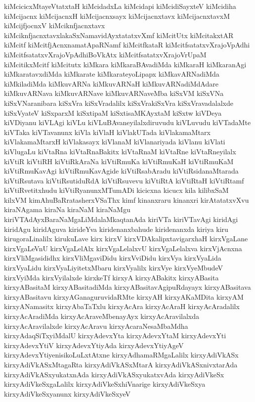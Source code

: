 {kiMcicicxMtayeVtatxtaH
kiMcidadxLa
kiMcidapi
kiMcidiSayxteV
kiMcidiha
kiMcijacnx
kiMcijacnxH
kiMcijacnxsayx
kiMcijacnxtavx
kiMcijacnxtavxM
kiMcijfjocnxV
kiMciknfjacnxtavx
kiMciknfjacnxtavxlakaSxNamavidAyxtatatxvXmf
kiMcitUtx
kiMcitakxtAR
kiMcitf
kiMcitfjAcnxnamatApaRNamf
kiMcitfkataR
kiMcitfsatatxvXrajoVpAdhi
kiMcitfsatatxvXrajoVpAdhiBoVkAtx
kiMcitfsatatxvXrajoVrUpaM
kiMcitikxMcitf
kiMcitutx
kiMkara
kiMkaraBAvadiMda
kiMkaraH
kiMkaranAgi
kiMkaratavxdiMda
kiMkarate
kiMkarateyoLipapx
kiMkavARNadiMda
kiMkiladiMda
kiMkuvARNa
kiMkuvARNaH
kiMkuvARNadiMdAdare
kiMkuvARNava
kiMkuvARNave
kiMkuvARNaveMba
kiSxVM
kiSxVNa
kiSxVNaranibara
kiSxVra
kiSxVradalilx
kiSxVrakiSxVra
kiSxVravadalalxde
kiSxVyateV
kiSxparxM
kiSxtipaM
kiSxtisaMKAyxtaM
kiSxtw
kiVDeya
kiVDiyanu
kiVLAgi
kiVLu
kiVLuBAvaneyilalxdiruvudu
kiVLuvudu
kiVTadaMte
kiVTaka
kiVTavanunx
kiVla
kiVlaH
kiVlakUTada
kiVlakamaMtarx
kiVlakamaMtarxH
kiVlakasayx
kiVlanaM
kiVlanariyada
kiVlanu
kiVlati
kiVlugaLu
kiVtaRna
kiVtaRnaBakitx
kiVtaRnaM
kiVtaRne
kiVtaRneyilalx
kiVtiR
kiVtiRH
kiVtiRkAraNa
kiVtiRmuKa
kiVtiRmuKaH
kiVtiRmuKaM
kiVtiRmuKavAgi
kiVtiRmuKavAgide
kiVtiRsabAradu
kiVtiRsidanaMtarada
kiVtiRsutava
kiVtiRsutiduRdA
kiVtiRsuvevu
kiVtiRtA
kiVtiRtaH
kiVtiRtamf
kiVtiRvetitxhudu
kiVtiRyanunxMTumADi
kicicxna
kicucx
kila
kilibxSaM
kilxVM
kimAhuBaRratasherxVSaThx
kimf
kinanxraru
kinanxri
kirAtatatxvXvu
kiraNAgama
kiraNa
kiraNaM
kiraNaMgu
kiriVTAdAyxBaraNaMgaLiMdalaMkaqtanAda
kiriVTa
kiriVTavAgi
kiridAgi
kiridAgu
kiridAguva
kirideYva
kiridenanxbahude
kiridenanxda
kiriya
kiru
kirugoraLinalilx
kirukuLave
kirx
kirxV
kirxVDAkalipxtavigarxhaH
kirxVgaLane
kirxVgaLeVnU
kirxVgaLelAlx
kirxVgaLelalxvU
kirxVgaLelalxva
kirxVjAcnxna
kirxVliMgasididhx
kirxVliMgaviDidu
kirxVviDidu
kirxVya
kirxVyaLida
kirxVyaLidu
kirxVyaLiyitetxMbaru
kirxVyalilx
kirxVye
kirxVyeMbudeV
kirxVyiMda
kirxVyilalxde
kirxkeTf
kirxyA
kirxyABakitx
kirxyABasita
kirxyABasitaM
kirxyABasitadiMda
kirxyABasitavAgipuRdayayx
kirxyABasitava
kirxyABasitavu
kirxyAGanaguruvidaRMte
kirxyAH
kirxyAKaMDita
kirxyAM
kirxyANamasitx
kirxyAbaTaTxlu
kirxyAcAra
kirxyAcAraH
kirxyAcAradalilx
kirxyAcAradiMda
kirxyAcAraveMbenayAyx
kirxyAcAravilalxda
kirxyAcAravilalxde
kirxyAcAravu
kirxyAcaraNesaMbaMdha
kirxyAdaqSiTxyiMdalU
kirxyAdevxYta
kirxyAdevxYtaM
kirxyAdevxYti
kirxyAdevxYtiV
kirxyAdevxYtiyAda
kirxyAdevxYtiyAgeV
kirxyAdevxYtiyenisikoLuLxtAtxne
kirxyAdhamaRMgaLalilx
kirxyAdiVkASx
kirxyAdiVkASxMtagaRta
kirxyAdiVkASxMtarA
kirxyAdiVkASxnivxtarAda
kirxyAdiVkASxyukatxnAda
kirxyAdiVkASxyukatxvAda
kirxyAdiVkeSx
kirxyAdiVkeSxgaLalilx
kirxyAdiVkeSxhiVnarige
kirxyAdiVkeSxya
kirxyAdiVkeSxyanunx
kirxyAdiVkeSxyeV
}
